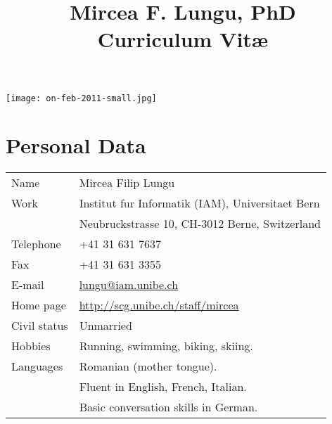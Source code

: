 \documentclass[a4paper]{article}
\newcommand{\longcv}[1]{#1}
\newcommand{\shortcv}[1]{}
\newcommand{\longcv}[1]{}
\newcommand{\shortcv}[1]{#1}
\begin{document}
\longcv{\title{\textsf{Mircea F. Lungu, PhD\\Curriculum Vit\ae}}}
\shortcv{\title{\textsf{Mircea F. Lungu, PhD \\Curriculum Vit\ae }}}
\pagestyle{myheadings}
\thispagestyle{plain}
\shortcv{\date{}}
\maketitle
\shortcv{\vspace{-2cm}}
\longcv{\hfill\texttt{[image: on-feb-2011-small.jpg]}\vspace{-4cm}}

\section{Personal Data}
\begin{tabular}{p{3cm}l}
Name				& Mircea Filip Lungu \\
Work				& Institut fur Informatik (IAM), Universitaet Bern \\
				& Neubruckstrasse 10, CH-3012 Berne, Switzerland \\
Telephone		& +41 31 631 7637 \\
Fax			& +41 31 631 3355 \\
E-mail			& \href{mailto:lungu@iam.unibe.ch}{lungu@iam.unibe.ch} \\
Home page		& \url{http://scg.unibe.ch/staff/mircea} \\
\longcv{
Civil status		& Unmarried\\
Hobbies			& Running, swimming, biking, skiing.\\
Languages		& Romanian (mother tongue).\\
				& Fluent in English, French, Italian.\\
				& Basic conversation skills in German.
} %

\end{tabular}


\end{document}
